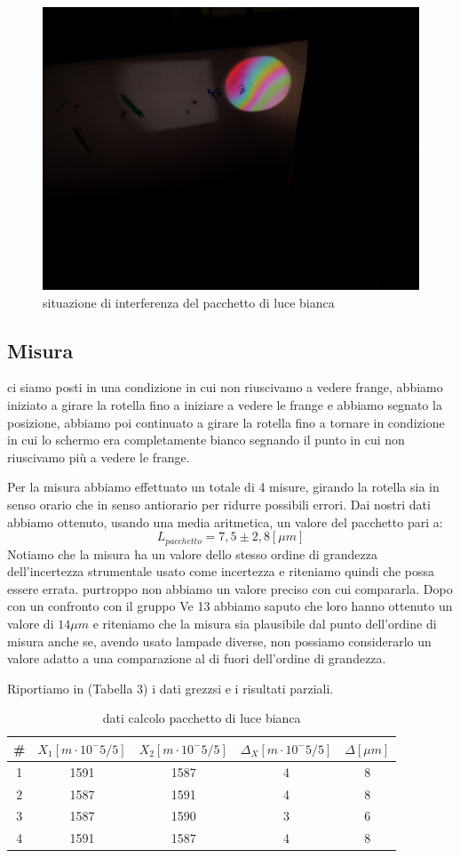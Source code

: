\documentclass{article}
\begin{document}
\begin{figure}[h!]
  \centering
  \includegraphics[width=0.6\linewidth]{IM pacchetto}
  \caption{situazione di interferenza del pacchetto di luce bianca}
\end{figure}


\subsection{Misura}
ci siamo posti in una condizione in cui non riuscivamo a vedere frange, abbiamo iniziato a girare la rotella fino a iniziare a vedere le frange e abbiamo segnato la posizione, abbiamo poi continuato a girare la rotella fino a tornare in condizione in cui lo schermo era completamente bianco segnando il punto in cui non riuscivamo più a vedere le frange.
 
Per la misura abbiamo effettuato un totale di 4 misure, girando la rotella sia in senso orario che in senso antiorario per ridurre possibili errori. Dai nostri dati abbiamo ottenuto, usando una media aritmetica, un valore del pacchetto pari a:
\[ L_{pacchetto} = 7,5 \pm 2,8 [\mu m] \]
Notiamo che la misura ha un valore dello stesso ordine di grandezza dell'incertezza strumentale usato come incertezza e riteniamo quindi che possa essere errata. purtroppo non abbiamo un valore preciso con cui compararla. Dopo con un confronto con il gruppo Ve 13 abbiamo saputo che loro hanno ottenuto un valore di $14 \mu m$ e riteniamo che la misura sia plausibile dal punto dell'ordine di misura anche se, avendo usato lampade diverse, non possiamo considerarlo un valore adatto a una comparazione al di fuori dell'ordine di grandezza.

Riportiamo in (Tabella 3) i dati grezzsi e i risultati parziali.


\begin{table}[h!]
\centering
\begin{tabular}{ | c | c | c | c | c | }
\hline
\# & $X_1 [m \cdot 10^-5/5]$ & $X_2 [m \cdot 10^-5/5]$ & $\Delta_X [m \cdot 10^-5/5]$ & $\Delta [\mu m]$\\
\hline
   1 & 1591 & 1587 & 4 & 8\\
   2 & 1587 & 1591 & 4 & 8\\
   3 & 1587 & 1590 & 3 & 6\\
   4 & 1591 & 1587 & 4 & 8\\
\hline
\end{tabular}
\caption{dati calcolo pacchetto di luce bianca}
\label{table:3}
\end{table}
\end{document}
